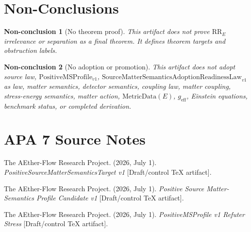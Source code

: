 \documentclass[11pt]{article}
\newcommand{\SMSAR}{\mathrm{SourceMatterSemanticsAdoptionReadinessLaw}_{v1}}
\newcommand{\PMSProf}{\mathrm{PositiveMSProfile}_{v1}}
\newcommand{\RRE}{\mathrm{RR}_E}
\newcommand{\MetricData}{\mathrm{MetricData}}
\newcommand{\geff}{g_{\mathrm{eff}}}
\newtheorem{nonconclusion}{Non-conclusion}
\begin{document}
\section{Non-Conclusions}

\begin{nonconclusion}[No theorem proof]
This artifact does not prove \(\RRE\) irrelevance or separation as a final
theorem. It defines theorem targets and obstruction labels.
\end{nonconclusion}

\begin{nonconclusion}[No adoption or promotion]
This artifact does not adopt source law, \(\PMSProf\), \(\SMSAR\) as law,
matter semantics, detector semantics, coupling law, matter coupling,
stress-energy semantics, matter action, \(\MetricData(E)\), \(\geff\),
Einstein equations, benchmark status, or completed derivation.
\end{nonconclusion}

\section{APA 7 Source Notes}

The AEther-Flow Research Project. (2026, July 1). \textit{PositiveSourceMatterSemanticsTarget
v1} [Draft/control TeX artifact].

The AEther-Flow Research Project. (2026, July 1). \textit{Positive Source
Matter-Semantics Profile Candidate v1} [Draft/control TeX artifact].

The AEther-Flow Research Project. (2026, July 1). \textit{PositiveMSProfile v1
Refuter Stress} [Draft/control TeX artifact].
\end{document}
